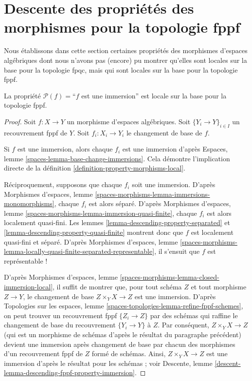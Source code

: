 \section{Descente des propriétés des morphismes pour la topologie fppf}
\label{section-descending-properties-morphisms-fppf}

\noindent
Nous établissons dans cette section certaines propriétés des morphismes d'espaces
algébriques dont nous n'avons pas (encore) pu montrer qu'elles sont locales sur
la base pour la topologie fpqc, mais qui sont locales sur la base
pour la topologie fppf.

\begin{lemma}
\label{lemma-descending-fppf-property-immersion}
La propriété $\mathcal{P}(f) =$``$f$ est une immersion''
est locale sur la base pour la topologie fppf.
\end{lemma}

\begin{proof}
Soit $f : X \to Y$ un morphisme d'espaces algébriques.
Soit $\{Y_i \to Y\}_{i \in I}$ un recouvrement fppf de $Y$.
Soit $f_i : X_i \to Y_i$ le changement de base de $f$.

\medskip\noindent
Si $f$ est une immersion, alors chaque $f_i$ est une immersion d'après
Espaces, lemme \ref{spaces-lemma-base-change-immersions}.
Cela démontre l'implication directe de la
définition \ref{definition-property-morphisms-local}.

\medskip\noindent
Réciproquement, supposons que chaque $f_i$ soit une immersion. D'après
Morphismes d'espaces,
lemme \ref{spaces-morphisms-lemma-immersions-monomorphisms},
chaque $f_i$ est alors séparé. D'après
Morphismes d'espaces,
lemme \ref{spaces-morphisms-lemma-immersion-quasi-finite},
chaque $f_i$ est alors localement quasi-fini.
Les lemmes \ref{lemma-descending-property-separated}
et \ref{lemma-descending-property-quasi-finite} montrent donc que
$f$ est localement quasi-fini et séparé.
D'après
Morphismes d'espaces, lemme
\ref{spaces-morphisms-lemma-locally-quasi-finite-separated-representable},
il s'ensuit que $f$ est représentable !

\medskip\noindent
D'après
Morphismes d'espaces, lemme \ref{spaces-morphisms-lemma-closed-immersion-local},
il suffit de montrer que, pour tout schéma $Z$ et tout morphisme $Z \to Y$,
le changement de base $Z \times_Y X \to Z$ est une immersion. D'après
Topologies sur les espaces, lemme \ref{spaces-topologies-lemma-refine-fppf-schemes},
on peut trouver un recouvrement fppf $\{Z_i \to Z\}$ par des schémas qui raffine
le changement de base du recouvrement $\{Y_i \to Y\}$ à $Z$.
Par conséquent, $Z \times_Y X \to Z$ (qui est un morphisme de schémas
d'après le résultat du paragraphe précédent) devient une immersion
après changement de base par chacun des morphismes d'un recouvrement fppf de $Z$ formé de schémas.
Ainsi, $Z \times_Y X \to Z$ est une immersion d'après le résultat pour les schémas ; voir
Descente, lemme \ref{descent-lemma-descending-fppf-property-immersion}.
\end{proof}

